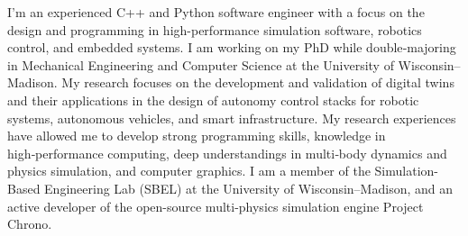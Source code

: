 

\begin{cvparagraph}

I'm an experienced C++ and Python software engineer with a focus on the design and programming in high-performance simulation software, robotics control, and embedded systems. I am working on my PhD while double‑majoring in Mechanical Engineering and Computer Science at the University of Wisconsin--Madison. My research focuses on the development and validation of digital twins and their applications in the design of autonomy control stacks for robotic systems, autonomous vehicles, and smart infrastructure. My research experiences have allowed me to develop strong programming skills, knowledge in high‑performance computing, deep understandings in multi‑body dynamics and physics simulation, and computer graphics. I am a member of the Simulation-Based Engineering Lab (SBEL) at the University of Wisconsin--Madison, and an active developer of the open-source multi-physics simulation engine Project Chrono.\\


\end{cvparagraph}